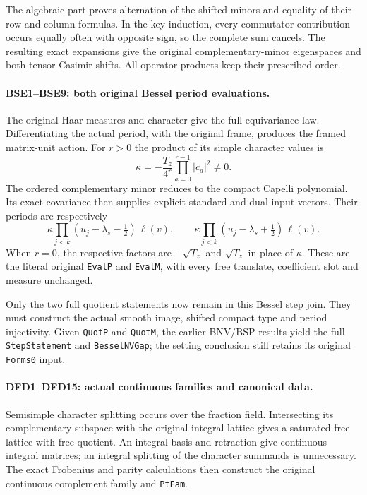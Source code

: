 The algebraic part proves alternation of the shifted minors and
equality of their row and column formulas. In the key induction,
every commutator contribution occurs equally often with opposite
sign, so the complete sum cancels. The resulting exact expansions
give the original complementary-minor eigenspaces and both tensor
Casimir shifts. All operator products keep their prescribed order.

\paragraph{BSE1--BSE9: both original Bessel period evaluations.}
The original Haar measures and character give the full equivariance
law. Differentiating the actual period, with the original frame,
produces the framed matrix-unit action. For $r>0$ the product of
its simple character values is
\[
 \kappa=-\frac{T_z}{4^r}\prod_{a=0}^{r-1}|c_a|^2\ne0.
\]
The ordered complementary minor reduces to the compact Capelli
polynomial. Its exact covariance then supplies explicit standard
and dual input vectors. Their periods are respectively
\[
 \kappa\prod_{j<k}(u_j-\lambda_s-\tfrac12)\,\ell(v),
 \qquad
 \kappa\prod_{j<k}(u_j-\lambda_s+\tfrac12)\,\ell(v).
\]
When $r=0$, the respective factors are
$-\sqrt{T_z}$ and $\sqrt{T_z}$ in place of $\kappa$.
These are the literal original \texttt{Eval\allowbreak P} and \texttt{Eval\allowbreak M},
with every free translate, coefficient slot and measure unchanged.

Only the two full quotient statements now remain in this Bessel
step join. They must construct the actual smooth image, shifted
compact type and period injectivity. Given \texttt{Quot\allowbreak P} and
\texttt{Quot\allowbreak M}, the earlier BNV/BSP results yield the full
\texttt{Step\allowbreak Statement} and \texttt{Bessel\allowbreak NVGap}; the setting
conclusion still retains its original \texttt{Forms0} input.

\paragraph{DFD1--DFD15: actual continuous families and canonical data.}
Semisimple character splitting occurs over the fraction field.
Intersecting its complementary subspace with the original integral
lattice gives a saturated free lattice with free quotient.
An integral basis and retraction give continuous integral matrices;
an integral splitting of the character summands is unnecessary.
The exact Frobenius and parity calculations then construct the
original continuous complement family and \texttt{Pt\allowbreak Fam}.

